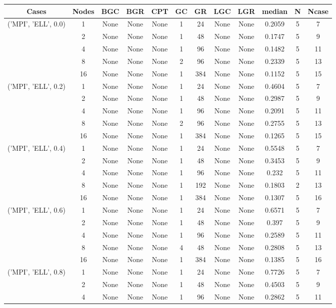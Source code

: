 \begin{tabular}{cccccccccccc}
\hline
Cases & Nodes& BGC& BGR& CPT& GC& GR& LGC& LGR& median & N & Ncase \\
\hline
\multirow{5}{*}{('MPI', 'ELL', 0.0)}& 1& None& None& None& 1& 24& None& None& 0.2059& 5& 7\\
& 2& None& None& None& 1& 48& None& None& 0.1747& 5& 9\\
& 4& None& None& None& 1& 96& None& None& 0.1482& 5& 11\\
& 8& None& None& None& 2& 96& None& None& 0.2339& 5& 13\\
& 16& None& None& None& 1& 384& None& None& 0.1152& 5& 15\\
\hline
\multirow{5}{*}{('MPI', 'ELL', 0.2)}& 1& None& None& None& 1& 24& None& None& 0.4604& 5& 7\\
& 2& None& None& None& 1& 48& None& None& 0.2987& 5& 9\\
& 4& None& None& None& 1& 96& None& None& 0.2091& 5& 11\\
& 8& None& None& None& 2& 96& None& None& 0.2755& 5& 13\\
& 16& None& None& None& 1& 384& None& None& 0.1265& 5& 15\\
\hline
\multirow{5}{*}{('MPI', 'ELL', 0.4)}& 1& None& None& None& 1& 24& None& None& 0.5548& 5& 7\\
& 2& None& None& None& 1& 48& None& None& 0.3453& 5& 9\\
& 4& None& None& None& 1& 96& None& None& 0.232& 5& 11\\
& 8& None& None& None& 1& 192& None& None& 0.1803& 2& 13\\
& 16& None& None& None& 1& 384& None& None& 0.1307& 5& 16\\
\hline
\multirow{5}{*}{('MPI', 'ELL', 0.6)}& 1& None& None& None& 1& 24& None& None& 0.6571& 5& 7\\
& 2& None& None& None& 1& 48& None& None& 0.397& 5& 9\\
& 4& None& None& None& 1& 96& None& None& 0.2589& 5& 11\\
& 8& None& None& None& 4& 48& None& None& 0.2808& 5& 13\\
& 16& None& None& None& 1& 384& None& None& 0.1385& 5& 16\\
\hline
\multirow{5}{*}{('MPI', 'ELL', 0.8)}& 1& None& None& None& 1& 24& None& None& 0.7726& 5& 7\\
& 2& None& None& None& 1& 48& None& None& 0.4503& 5& 9\\
& 4& None& None& None& 1& 96& None& None& 0.2862& 5& 11\\

\end{tabular}
